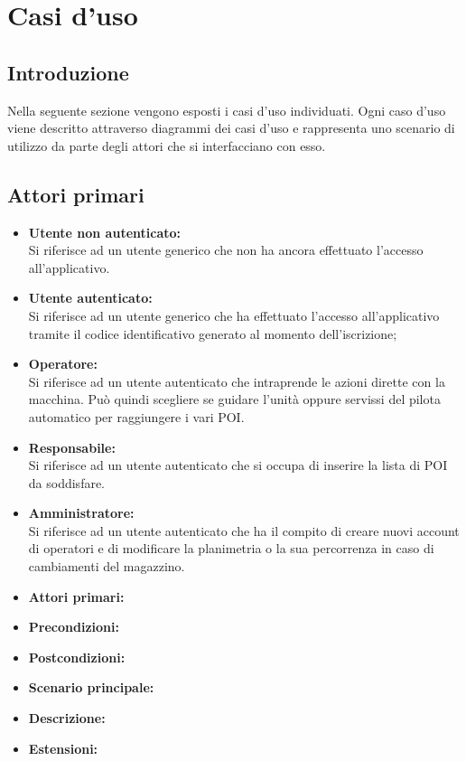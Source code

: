 \section{Casi d'uso}
\subsection{Introduzione}
Nella seguente sezione vengono esposti i casi d'uso individuati. Ogni caso d'uso viene descritto attraverso diagrammi dei casi d'uso e rappresenta uno scenario di utilizzo da parte degli attori che si interfacciano con esso.
\subsection{Attori primari}
\begin{itemize}
	\item{\textbf{Utente non autenticato:}\\
	Si riferisce ad un utente generico che non ha ancora effettuato l'accesso all'applicativo.}
	\item{\textbf{Utente autenticato:}\\
	Si riferisce ad un utente generico che ha effettuato l'accesso all'applicativo tramite il codice identificativo generato al momento dell'iscrizione;}
	\item{\textbf{Operatore:}\\
	Si riferisce ad un utente autenticato che intraprende le azioni dirette con la macchina. Può quindi scegliere se guidare l'unità oppure servissi del pilota automatico per raggiungere i vari POI.}
	\item{\textbf{Responsabile:}\\
	Si riferisce ad un utente autenticato che si occupa di inserire la lista di POI da soddisfare.}
	\item{\textbf{Amministratore:}\\
	Si riferisce ad un utente autenticato che ha il compito di creare nuovi account di operatori e di modificare la planimetria o la sua percorrenza in caso di cambiamenti del magazzino.}
\end{itemize}

\begin{itemize}
	\item 	\textbf{Attori primari:}
	\item 	\textbf{Precondizioni:}
	\item 	\textbf{Postcondizioni:}
	\item 	\textbf{Scenario principale:}
	\item 	\textbf{Descrizione:}
	\item 	\textbf{Estensioni:}
\end{itemize}

